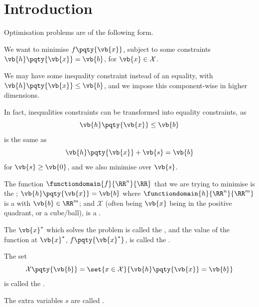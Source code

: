 \section*{Introduction}

Optimisation problems are of the following form.

\begin{problem}
    We want to minimise \(f\pqty{\vb{x}}\), subject to some constraints \(\vb{h}\pqty{\vb{x}} = \vb{b}\), for \(\vb{x} \in \mathcal{X}\).
\end{problem}

We may have some inequality constraint instead of an equality, with \(\vb{h}\pqty{\vb{x}} \leq \vb{b}\), and we impose this component-wise in higher dimensions.

In fact, inequalities constraints can be transformed into equality constraints, as
\[
    \vb{h}\pqty{\vb{x}} \leq \vb{b}
\]
is the same as
\[
    \vb{h}\pqty{\vb{x}} + \vb{s} = \vb{b}
\]
for \(\vb{s} \geq \vb{0}\), and we also minimise over \(\vb{s}\).

\begin{definition}
    \label{def:terminology}%
    The function \(\functiondomain{f}{\RR^n}{\RR}\) that we are trying to minimise is the ; \(\vb{h}\pqty{\vb{x}} = \vb{b}\) where \(\functiondomain{h}{\RR^n}{\RR^m}\) is a  with \(\vb{b} \in \RR^m\); and \(\mathcal{X}\) (often being \(\vb{x}\) being in the positive quadrant, or a cube/ball), is a .

    The \(\vb{x}^*\) which solves the problem is called the , and the value of the function at \(\vb{x}^*\), \(f\pqty{\vb{x}^*}\), is called the .

    The set
    \[
        \mathcal{X}\pqty{\vb{b}} = \set{x \in \mathcal{X}}{\vb{h}\pqty{\vb{x}} = \vb{b}}
    \]
    is called the .

    The extra variables \(s\) are called .
\end{definition}
